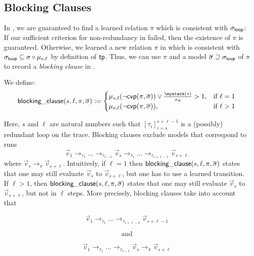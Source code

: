 \subsection{Blocking Clauses}
\label{sec:block}

In , we are guaranteed to find a learned relation $\pi$ which is consistent
with $\sigma_{\mathsf{loop}}$: If our sufficient criterion for non-redundancy in
 failed, then the existence of $\pi$ is guaranteed.
%
Otherwise, we learned a new relation $\pi$ in  which is consistent with $\sigma_{\mathsf{loop}} \subseteq \sigma \circ \mu_{s,\ell}$ by definition of $\mathsf{tp}$.
%
Thus, we can use $\pi$ and a model $\overline{\sigma} \supseteq \sigma_{\mathsf{loop}}$ of $\pi$ to record a \emph{blocking clause} in .
%
\begin{definition}
  \label{def:blocking}
  We define:
  \[
    \blockingclause(s,\ell,\pi,\overline{\sigma}) \Def
    \begin{cases}
      \mu_{s,\ell}(\neg \mbip(\pi, \overline{\sigma})) \lor \ind[\id]{x}{s} > 1, & \text{if } \ell = 1 \\
      \mu_{s,\ell}(\neg \mbip(\pi, \overline{\sigma})),                         & \text{if } \ell > 1
    \end{cases}
  \]
\end{definition}
%
Here, $s$ and $\ell$ are natural numbers such that $[\tau_i]_{i=s}^{s+\ell-1}$ is a (possibly) redundant loop on the trace.
%
Blocking clauses exclude models that correspond to runs
\begin{equation}
  \label{blockedRun}
  \vec{v}_1 \to_{\tau_1} \ldots \to_{\tau_{s-1}} \vec{v}_s \to_{\tau_{s}} \ldots \to_{\tau_{s+\ell-1}} \vec{v}_{s+\ell}
\end{equation}
where $\vec{v}_{s} \to_{\pi} \vec{v}_{s+\ell}$. Intuitively, if $\ell = 1$ then
$\mathsf{blocking\_clause}(s,\ell,\pi,\overline{\sigma})$ states that one may still evaluate 
$\vec{v}_s$ to
$\vec{v}_{s+\ell}$, but one has to use a learned transition. If $\ell > 1$, then
$\mathsf{blocking\_clause}(s,\ell,\pi,\overline{\sigma})$
states that one may still  evaluate 
$\vec{v}_s$ to
$\vec{v}_{s+\ell}$, but not in $\ell$ steps.
More precisely, 
blocking clauses take into account that%

\vspace{-0.8em}
\noindent
\begin{minipage}{0.44\textwidth}
  \begin{equation}
    \label{prefix}
    \vec{v}_1 \to_{\tau_1} \ldots \to_{\tau_{s+\ell-2}} \vec{v}_{s+\ell-1}
  \end{equation}
\end{minipage}
\begin{minipage}{0.1\textwidth}
  \begin{equation*}
    \text{and}
  \end{equation*}
\end{minipage}
\begin{minipage}{0.44\textwidth}
  \begin{equation}
    \label{unblockedRun}
    \vec{v}_1 \to_{\tau_1} \ldots \to_{\tau_{s-1}} \vec{v}_s \to_{\pi} \vec{v}_{s+\ell}
  \end{equation}
\end{minipage}

